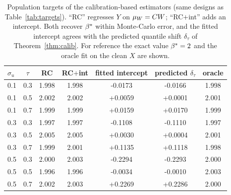 \begin{table}[ht]
\centering
\footnotesize
\caption{Population targets of the calibration-based estimators (same designs as Table~\ref{tab:targets}). ``RC'' regresses $Y$ on $\mu_W=C W$; ``RC$+$int'' adds an intercept. Both recover $\beta^*$ within Monte-Carlo error, and the fitted intercept agrees with the predicted quantile shift $\delta_\tau$ of Theorem~\ref{thm:calib}. For reference the exact value $\beta^*=2$ and the oracle fit on the clean $X$ are shown.}
\label{tab:targets_calib}
\begin{tabular}{lcccccc}
\toprule
$\sigma_u$ & $\tau$ & RC & RC$+$int & fitted intercept & predicted $\delta_\tau$ & oracle \\
\midrule
0.1 & 0.3 & 1.998 & 1.998 & -0.0173 & -0.0166 & 1.998 \\
0.1 & 0.5 & 2.002 & 2.002 & +0.0059 & +0.0001 & 2.001 \\
0.1 & 0.7 & 1.999 & 1.999 & +0.0159 & +0.0170 & 1.999 \\
\midrule
0.3 & 0.3 & 1.997 & 1.997 & -0.1108 & -0.1110 & 1.997 \\
0.3 & 0.5 & 2.005 & 2.005 & +0.0030 & +0.0004 & 2.001 \\
0.3 & 0.7 & 1.999 & 2.001 & +0.1135 & +0.1118 & 1.998 \\
\midrule
0.5 & 0.3 & 2.000 & 2.003 & -0.2294 & -0.2293 & 2.000 \\
0.5 & 0.5 & 1.996 & 1.996 & -0.0034 & -0.0010 & 2.003 \\
0.5 & 0.7 & 2.002 & 2.003 & +0.2269 & +0.2286 & 2.000 \\
\bottomrule
\end{tabular}
\end{table}
